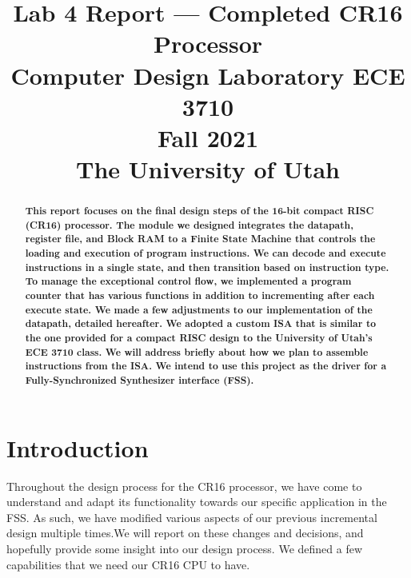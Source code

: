 \documentclass[conference]{IEEEtran}
\begin{document}
\title{Lab 4 Report --- Completed CR16 Processor\\
\Large{Computer Design Laboratory ECE 3710}\\
\Large{Fall 2021}\\
\Large{The University of Utah}}

\author{
\and
{}
\and
{}
\and
{}
}

\maketitle
\begin{abstract}
\textbf{This report focuses on the final design steps of the 16-bit compact RISC (CR16) processor. The module we designed integrates the datapath, register file, and Block RAM to a Finite State Machine that controls the loading and execution of program instructions. We can decode and execute instructions in a single state, and then transition based on instruction type. To manage the exceptional control flow, we implemented a program counter that has various functions in addition to incrementing after each execute state. We made a few adjustments to our implementation of the datapath, detailed hereafter. We adopted a custom ISA that is similar to the one provided for a compact RISC design to the University of Utah's ECE 3710 class. We will address briefly about how we plan to assemble instructions from the ISA. We intend to use this project as the driver for a Fully-Synchronized Synthesizer interface (FSS).}
\end{abstract}

\section{Introduction}
Throughout the design process for the CR16 processor, we have come to understand and adapt its functionality towards our specific application in the FSS. As such, we have modified various aspects of our previous incremental design multiple times.We will report on these changes and decisions, and hopefully provide some insight into our design process. We defined a few capabilities that we need our CR16 CPU to have. 
\end{document}
